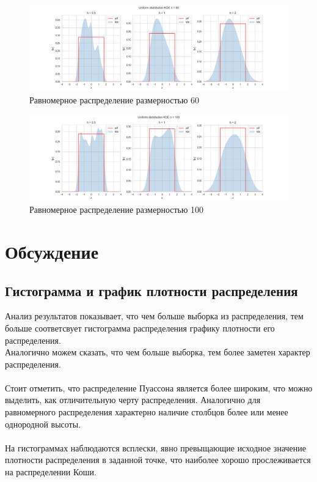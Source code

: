 \documentclass[a4paper,14pt]{article}
\begin{document}
	\begin{figure}[H]
		\centering
		\includegraphics[scale=0.35]{../image/lab4/lab4_kde_uniform_60.png}
		\caption{Равномерное распределение размерностью 60}
	\end{figure}
	
	\begin{figure}[H]
		\centering
		\includegraphics[scale=0.35]{../image/lab4/lab4_kde_uniform_100.png}
		\caption{Равномерное распределение размерностью 100}
	\end{figure}
	
	\section{Обсуждение}
	\subsection{Гистограмма и график плотности распределения}
	Анализ результатов показывает, что чем больше выборка из распределения, тем больше соответсвует гистограмма распределения графику плотности его распределения.\\
	Аналогично можем сказать, что чем больше выборка, тем более заметен характер распределения.
	~\\
	~\\
	Стоит отметить, что распределение Пуассона является более широким, что можно выделить, как отличительную черту распределения. Аналогично для равномерного распределения характерно наличие столбцов более или менее однородной высоты. 
	~\\
	~\\
	На гистограммах наблюдаются всплески, явно превыщающие исходное значение плотности распределения в заданной точке, что наиболее хорошо прослеживается на распределении Коши.
	
\end{document}
